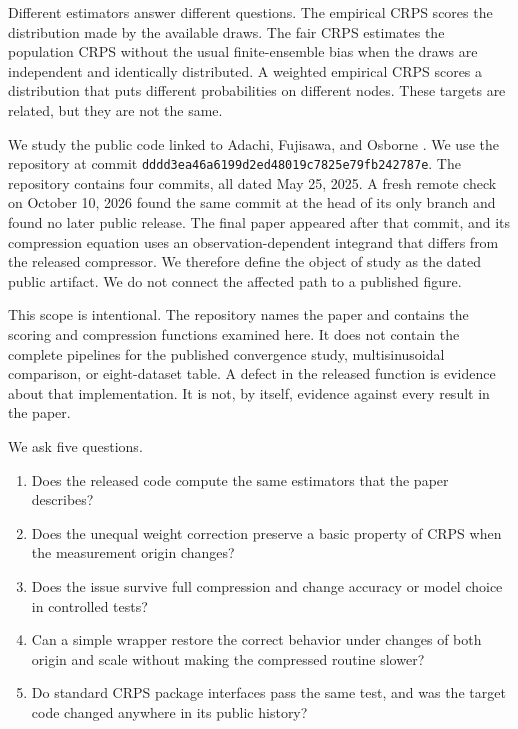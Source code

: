 \documentclass[11pt]{article}
\begin{document}
Different estimators answer different questions. The empirical CRPS scores the distribution made by the available draws. The fair CRPS estimates the population CRPS without the usual finite-ensemble bias when the draws are independent and identically distributed. A weighted empirical CRPS scores a distribution that puts different probabilities on different nodes. These targets are related, but they are not the same.

We study the public code linked to Adachi, Fujisawa, and Osborne \cite{adachi}. We use the repository at commit \texttt{dddd3ea46a6199d2ed48019c7825e79fb242787e}. The repository contains four commits, all dated May 25, 2025. A fresh remote check on October 10, 2026 found the same commit at the head of its only branch and found no later public release. The final paper appeared after that commit, and its compression equation uses an observation-dependent integrand that differs from the released compressor. We therefore define the object of study as the dated public artifact. We do not connect the affected path to a published figure.

This scope is intentional. The repository names the paper and contains the scoring and compression functions examined here. It does not contain the complete pipelines for the published convergence study, multisinusoidal comparison, or eight-dataset table. A defect in the released function is evidence about that implementation. It is not, by itself, evidence against every result in the paper.

We ask five questions.
\begin{enumerate}
\item Does the released code compute the same estimators that the paper describes?
\item Does the unequal weight correction preserve a basic property of CRPS when the measurement origin changes?
\item Does the issue survive full compression and change accuracy or model choice in controlled tests?
\item Can a simple wrapper restore the correct behavior under changes of both origin and scale without making the compressed routine slower?
\item Do standard CRPS package interfaces pass the same test, and was the target code changed anywhere in its public history?
\end{enumerate}
\end{document}
